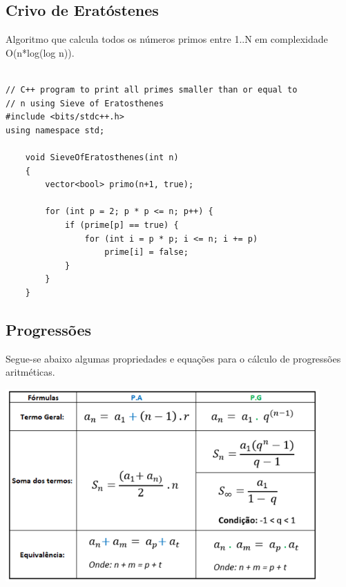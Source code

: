 \subsection{Crivo de Eratóstenes}
Algoritmo que calcula todos os números primos entre 1..N em complexidade \\
 O(n*log(log n)).
\begin{verbatim}
    
// C++ program to print all primes smaller than or equal to
// n using Sieve of Eratosthenes
#include <bits/stdc++.h>
using namespace std;
 
    void SieveOfEratosthenes(int n)
    {
        vector<bool> primo(n+1, true);
    
        for (int p = 2; p * p <= n; p++) {
            if (prime[p] == true) {
                for (int i = p * p; i <= n; i += p)
                    prime[i] = false;
            }
        }
    }
\end{verbatim}

\subsection{Progressões}
    Segue-se abaixo algumas propriedades e equações para o cálculo de 
    progressões aritméticas.
    
    \includegraphics[width=120mm]{7_teoria_dos_numeros/PA_PG.png}


\pagebreak
